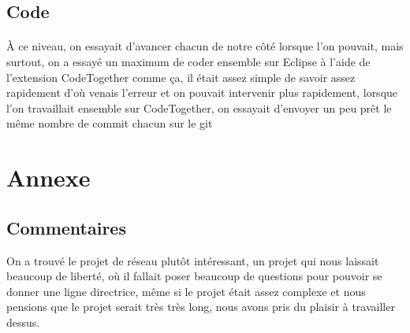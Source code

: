 \documentclass[a4paper,titlepage]{report}
\begin{document}
\subsection{Code}
\paragraph{}
À ce niveau, on essayait d'avancer chacun de notre côté lorsque l'on pouvait, mais surtout, on a essayé un maximum de coder ensemble sur Eclipse à l'aide de l'extension CodeTogether comme ça, il était assez simple de savoir assez rapidement d'où venais l'erreur et on pouvait intervenir plus rapidement, lorsque l'on travaillait ensemble sur CodeTogether, on essayait d'envoyer un peu prêt le même nombre de commit chacun sur le git
\section{Annexe}
\subsection{Commentaires}
On a trouvé le projet de réseau plutôt intéressant, un projet qui nous laissait beaucoup de liberté, où il fallait poser beaucoup de questions pour pouvoir se donner une ligne directrice, même si le projet était assez complexe et nous pensions que le projet serait très très long, nous avons pris du plaisir à travailler dessus.
\end{document}
